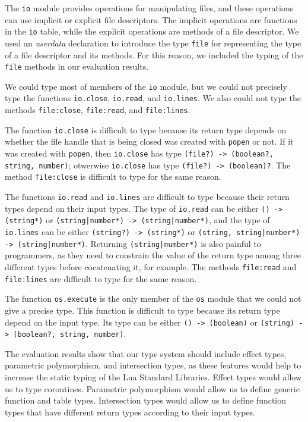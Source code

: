 The \texttt{io} module provides operations for manipulating files,
and these operations can use implicit or explicit file descriptors.
The implicit operations are functions in the \texttt{io} table,
while the explicit operations are methods of a file descriptor.
We used an \emph{userdata} declaration to introduce the type
\texttt{file} for representing the type of a file descriptor
and its methods.
For this reason, we included the typing of the \texttt{file}
methods in our evaluation results.

We could type most of members of the \texttt{io} module,
but we could not precisely type the functions \texttt{io.close},
\texttt{io.read}, and \texttt{io.lines}.
We also could not type the methods \texttt{file:close},
\texttt{file:read}, and \texttt{file:lines}.

The function \texttt{io.close} is difficult to type
because its return type depends on whether the file handle that is
being closed was created with \texttt{popen} or not.
If it was created with \texttt{popen}, then \texttt{io.close}
has type \texttt{(file?) -> (boolean?, string, number)};
otwerwise \texttt{io.close} has type \texttt{(file?) -> (boolean)?}.
The method \texttt{file:close} is difficult to type for the same reason.

The functions \texttt{io.read} and \texttt{io.lines} are difficult
to type because their return types depend on their input types.
The type of \texttt{io.read} can be either \texttt{() -> (string*)}
or \texttt{(string|number*) -> (string|number*)}, and
the type of \texttt{io.lines} can be either \texttt{(string?) -> (string*)}
or \texttt{(string, string|number*) -> (string|number*)}.
Returning \texttt{(string|number*)} is also painful to programmers, as
they need to constrain the value of the return type among three
different types before cocatenating it, for example.
The methods \texttt{file:read} and \texttt{file:lines} are difficult
to type for the same reason.

The function \texttt{os.execute} is the only member of the \texttt{os}
module that we could not give a precise type.
This function is difficult to type because its return type depend on
the input type.
Its type can be either \texttt{() -> (boolean)} or
\texttt{(string) -> (boolean?, string, number)}.

The evaluation results show that our type system should include effect
types, parametric polymorphism, and intersection types, as these
features would help to increase the static typing of the Lua Standard Libraries.
Effect types would allow us to type coroutines.
Parametric polymorphism would allow us to define generic function and table types.
Intersection types would allow us to define function types that have
different return types according to their input types.

